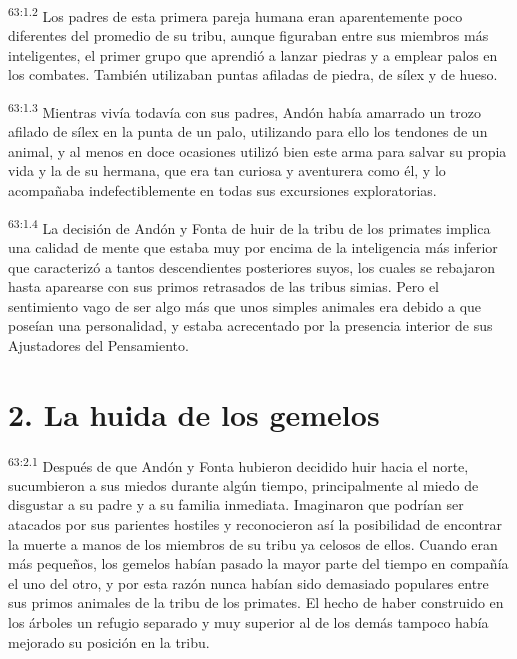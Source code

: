 \par
\textsuperscript{63:1.2} Los padres de esta primera pareja humana eran aparentemente poco diferentes del promedio de su tribu, aunque figuraban entre sus miembros más inteligentes, el primer grupo que aprendió a lanzar piedras y a emplear palos en los combates. También utilizaban puntas afiladas de piedra, de sílex y de hueso.

\par
\textsuperscript{63:1.3} Mientras vivía todavía con sus padres, Andón había amarrado un trozo afilado de sílex en la punta de un palo, utilizando para ello los tendones de un animal, y al menos en doce ocasiones utilizó bien este arma para salvar su propia vida y la de su hermana, que era tan curiosa y aventurera como él, y lo acompañaba indefectiblemente en todas sus excursiones exploratorias.

\par
\textsuperscript{63:1.4} La decisión de Andón y Fonta de huir de la tribu de los primates implica una calidad de mente que estaba muy por encima de la inteligencia más inferior que caracterizó a tantos descendientes posteriores suyos, los cuales se rebajaron hasta aparearse con sus primos retrasados de las tribus simias. Pero el sentimiento vago de ser algo más que unos simples animales era debido a que poseían una personalidad, y estaba acrecentado por la presencia interior de sus Ajustadores del Pensamiento.

\section*{2. La huida de los gemelos}
\par
\textsuperscript{63:2.1} Después de que Andón y Fonta hubieron decidido huir hacia el norte, sucumbieron a sus miedos durante algún tiempo, principalmente al miedo de disgustar a su padre y a su familia inmediata. Imaginaron que podrían ser atacados por sus parientes hostiles y reconocieron así la posibilidad de encontrar la muerte a manos de los miembros de su tribu ya celosos de ellos. Cuando eran más pequeños, los gemelos habían pasado la mayor parte del tiempo en compañía el uno del otro, y por esta razón nunca habían sido demasiado populares entre sus primos animales de la tribu de los primates. El hecho de haber construido en los árboles un refugio separado y muy superior al de los demás tampoco había mejorado su posición en la tribu.

